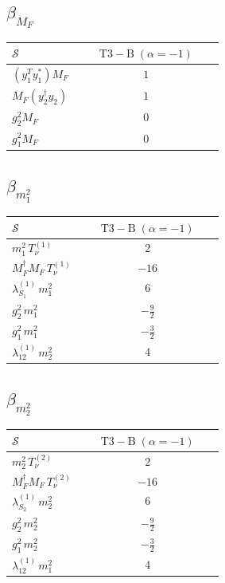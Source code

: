 \documentclass[9pt]{article}
\begin{document}
\subsection*{$ \beta_{M_F} $}
\begin{longtable}{@{}p{0.31\linewidth}c@{}}
\toprule
$\mathcal{S}$ & $ \mathrm{T3-B}\;(\alpha=-1) $ \\
\midrule
$ (y_1^T y_1^*)M_F $ & $ 1 $ \\
$ M_F(y_2^\dagger y_2) $ & $ 1 $ \\
$ g_2^2M_F $ & $ 0 $ \\
$ g_1^2M_F $ & $ 0 $ \\
\bottomrule
\end{longtable}
\subsection*{$ \beta_{m_1^{2}} $}
\begin{longtable}{@{}p{0.31\linewidth}c@{}}
\toprule
$\mathcal{S}$ & $ \mathrm{T3-B}\;(\alpha=-1) $ \\
\midrule
$ m_1^{2}\,T_{\nu}^{(1)} $ & $ 2 $ \\
$ M_F^\dagger M_F\,T_{\nu}^{(1)} $ & $ -16 $ \\
$ \lambda_{S_1}^{(1)}\,m_1^{2} $ & $ 6 $ \\
$ g_2^2\,m_1^{2} $ & $ - \frac{9}{2} $ \\
$ g_1^2\,m_1^{2} $ & $ - \frac{3}{2} $ \\
$ \lambda_{12}^{(1)}\,m_2^{2} $ & $ 4 $ \\
\bottomrule
\end{longtable}
\subsection*{$ \beta_{m_2^{2}} $}
\begin{longtable}{@{}p{0.31\linewidth}c@{}}
\toprule
$\mathcal{S}$ & $ \mathrm{T3-B}\;(\alpha=-1) $ \\
\midrule
$ m_2^{2}\,T_{\nu}^{(2)} $ & $ 2 $ \\
$ M_F^\dagger M_F\,T_{\nu}^{(2)} $ & $ -16 $ \\
$ \lambda_{S_2}^{(1)}\,m_2^{2} $ & $ 6 $ \\
$ g_2^2\,m_2^{2} $ & $ - \frac{9}{2} $ \\
$ g_1^2\,m_2^{2} $ & $ - \frac{3}{2} $ \\
$ \lambda_{12}^{(1)}\,m_1^{2} $ & $ 4 $ \\
\bottomrule
\end{longtable}
\end{document}
